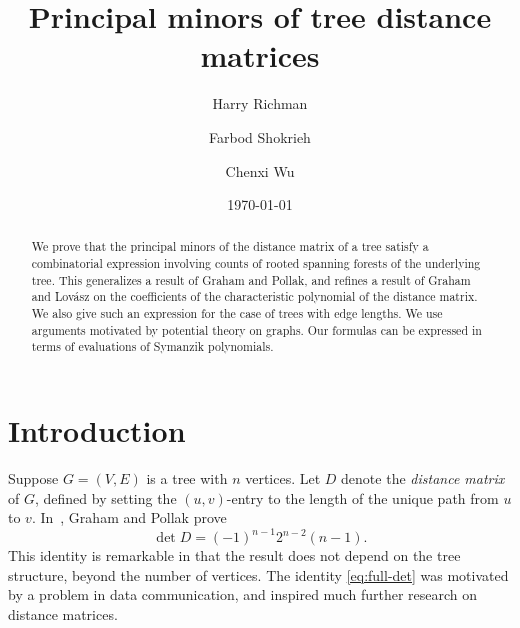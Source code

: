 \documentclass[12pt]{amsart}
\theoremstyle{definition}
\begin{document}
\title{Principal minors of tree distance matrices}
\author{Harry Richman}
\author{Farbod Shokrieh}
\author{Chenxi Wu}
\date{\today}



\begin{abstract}
We prove that the principal minors of the distance matrix of a tree satisfy a combinatorial expression involving counts of rooted spanning forests of the underlying tree.
This generalizes a result of Graham and Pollak,
and refines a result of Graham and Lov\'asz on the coefficients of the characteristic polynomial of the distance matrix.
We also give such an expression for the case of trees with edge lengths.
We use arguments motivated by potential theory on graphs.
Our formulas can be expressed in terms of evaluations of Symanzik polynomials.
\end{abstract}
\maketitle

\setcounter{tocdepth}{1}
\tableofcontents

\section{Introduction}
\renewcommand*{\themainthm}{\Alph{mainthm}}

Suppose $G = (V,E)$ is a tree with $n$ vertices.
Let $D$ denote the {\em distance matrix} of $G$, defined by setting the $(u,v)$-entry to the length of the unique path from $u$ to $v$.
In~\cite{graham-pollak}, Graham and Pollak prove
\begin{equation}\label{eq:full-det}
	\det D = (-1)^{n-1} 2^{n-2} (n-1). 
\end{equation}
This identity is remarkable in that the result does not depend on the tree structure,
beyond the number of vertices.
The identity \eqref{eq:full-det} was motivated by a problem in data communication,
and inspired much further research on distance matrices.
\end{document}
